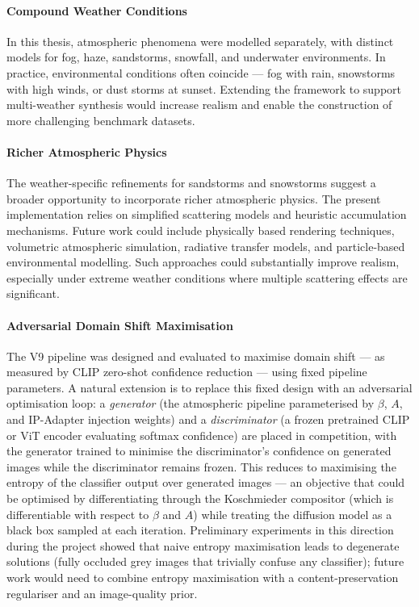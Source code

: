 \paragraph{Compound Weather Conditions}
In this thesis, atmospheric phenomena were modelled separately, with distinct models for fog, haze, sandstorms, snowfall, and underwater environments. In practice, environmental conditions often coincide — fog with rain, snowstorms with high winds, or dust storms at sunset. Extending the framework to support multi-weather synthesis would increase realism and enable the construction of more challenging benchmark datasets.

\paragraph{Richer Atmospheric Physics}
The weather-specific refinements for sandstorms and snowstorms suggest a broader opportunity to incorporate richer atmospheric physics. The present implementation relies on simplified scattering models and heuristic accumulation mechanisms. Future work could include physically based rendering techniques, volumetric atmospheric simulation, radiative transfer models, and particle-based environmental modelling. Such approaches could substantially improve realism, especially under extreme weather conditions where multiple scattering effects are significant.

\paragraph{Adversarial Domain Shift Maximisation}
The V9 pipeline was designed and evaluated to maximise domain shift --- as measured by CLIP zero-shot confidence reduction --- using fixed pipeline parameters. A natural extension is to replace this fixed design with an adversarial optimisation loop: a \emph{generator} (the atmospheric pipeline parameterised by $\beta$, $A$, and IP-Adapter injection weights) and a \emph{discriminator} (a frozen pretrained CLIP or ViT encoder evaluating softmax confidence) are placed in competition, with the generator trained to minimise the discriminator's confidence on generated images while the discriminator remains frozen. This reduces to maximising the entropy of the classifier output over generated images --- an objective that could be optimised by differentiating through the Koschmieder compositor (which is differentiable with respect to $\beta$ and $A$) while treating the diffusion model as a black box sampled at each iteration. Preliminary experiments in this direction during the project showed that naive entropy maximisation leads to degenerate solutions (fully occluded grey images that trivially confuse any classifier); future work would need to combine entropy maximisation with a content-preservation regulariser and an image-quality prior.

